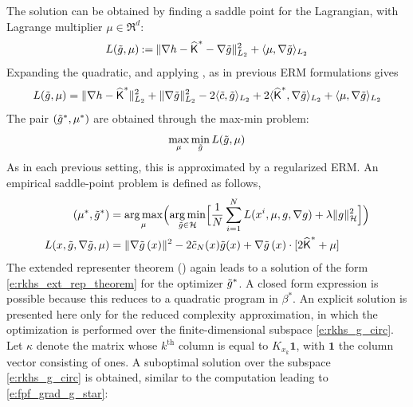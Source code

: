 The solution can be obtained by finding a saddle point for the Lagrangian,  with Lagrange multiplier $\mu  \in\Re^d$:
\begin{equation}
L(\tilg, \mu ) \eqdef   \| \nabla h - \hakFPF^* - \nabla \tilg \|^2_{L_2} +  \langle \mu ,  \nabla \tilg \rangle_{L_2}
\label{e:fpf_lag_dual}
\end{equation}
Expanding the quadratic, and applying , as in previous ERM formulations gives
\begin{equation}
L(\tilde g, \mu ) = \| \nabla h - \widehat{\text{\sf K}}^*\|_{L_2}^2 + \|\nabla \tilde g\|_{L_2}^2 - 2 \langle \tilde c, \tilde g \rangle_{L_2} + 2 \langle \widehat{\text{\sf K}}^*, \nabla \tilde g \rangle_{L_2} +  \langle \mu ,  \nabla \tilde g \rangle_{L_2}
\end{equation}
The pair $(\tilde g^*,\mu^*) $ are obtained through the max-min problem:
\begin{equation}
\max_\mu \min_{\tilde g}
L(\tilde g, \mu )
\end{equation}
As in each previous setting, this is approximated by a regularized ERM.
An empirical saddle-point problem is defined as follows,
\begin{equation}
\begin{aligned}
(\mu^* ,  \tilde g^*)  & =
\mathop{\rm arg{\,}max}_\mu  \Bigl(\mathop{\rm arg{\,}min}_{\tilde g \in {\cal H}} \Bigl[ \frac{1}{N} \sum_{i=1}^N  L(x^i,\mu, g,\nabla g) + \lambda \|g\|^2_{\cal H} \Bigr] \Bigr) \\
L(x,\tilde g,\nabla \tilde g, \mu)
&= \|\nabla \tilde g\, (x) \|^2    - 2   \tilde c_N(x)   \tilde g (x) +     \nabla \tilde g \, (x) \cdot [2 \widehat{\text{\sf K}}^*   + \mu]
\end{aligned}
\end{equation}
The extended representer theorem () again leads to a solution of the form \eqref{e:rkhs_ext_rep_theorem} for the optimizer $ \tilde g^*$.
A closed form expression is possible because this reduces to a quadratic program in $\beta^*$. An explicit solution is presented here only for the reduced complexity approximation, in which the optimization is performed over the finite-dimensional subspace \eqref{e:rkhs_g_circ}. Let $\kappa$ denote the matrix whose $k^{\text{th}}$ column is equal to $K_{x_k}\pmb{1}$,  with $\pmb{1}$ the column vector consisting of ones.   A suboptimal solution over the subspace \eqref{e:rkhs_g_circ} is obtained, similar to the computation leading to   \eqref{e:fpf_grad_g_star}:
